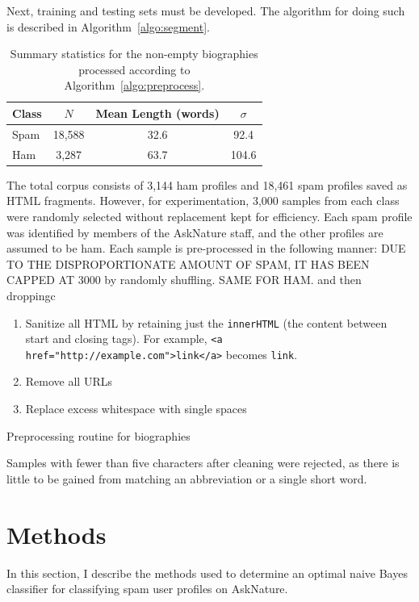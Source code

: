 \documentclass[10pt]{article}
\begin{document}
Next, training and testing sets must be developed. The algorithm for doing
such is described in Algorithm~\ref{algo:segment}.

\begin{table}
  \centering
  \caption{Summary statistics for the non-empty biographies processed
    according to Algorithm~\ref{algo:preprocess}.}
  \label{table:corpus-stats}
  \begin{tabular}{lccc}
    \toprule
    Class & $N$ & Mean Length (words) & $\sigma$\\ \midrule
    Spam  & 18,588 & 32.6 & 92.4 \\
    Ham   & 3,287  & 63.7 & 104.6 \\
    \bottomrule
  \end{tabular}
\end{table}


The total corpus consists of 3,144 ham profiles and 18,461 spam profiles saved
as HTML fragments. However, for experimentation, 3,000 samples from each class
were randomly selected without replacement kept for efficiency. Each spam profile was identified by members of the
AskNature staff, and the other profiles are assumed to be ham. Each sample is
pre-processed in the following manner:
DUE TO THE DISPROPORTIONATE AMOUNT OF SPAM, IT HAS BEEN CAPPED AT 3000 by
randomly shuffling. SAME FOR HAM. and then droppingc

\begin{algorithm}
\begin{enumerate}
  \item Sanitize all HTML by retaining just the \texttt{innerHTML} (the
    content between start and closing tags). For example, \texttt{<a
      href="http://example.com">link</a>} becomes \texttt{link}.
  \item Remove all URLs
  \item Replace excess whitespace with single spaces
\end{enumerate}
\caption{Preprocessing routine for biographies}
\label{algo:preprocess}
\end{algorithm}

Samples with fewer than five characters after cleaning were rejected, as there
is little to be gained from matching an abbreviation or a single short word.

\section{Methods}

In this section, I describe the methods used to determine an optimal naive
Bayes classifier for classifying spam user profiles on AskNature.
\end{document}
